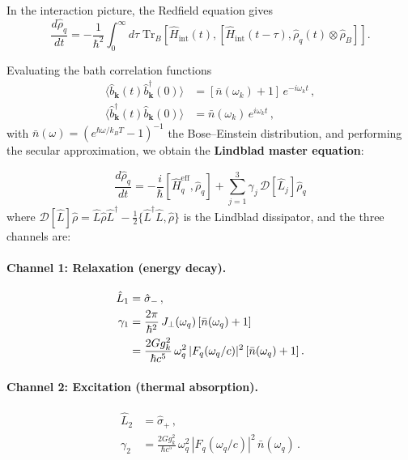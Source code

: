 \documentclass[aps,prl,twocolumn,superscriptaddress,nofootinbib,longbibliography]{revtex4-2}
\newcommand{\Tr}{\mathrm{Tr}}
\begin{document}
In the interaction picture, the Redfield equation gives
\begin{equation}
\frac{d\hat{\rho}_q}{dt} = -\frac{1}{\hbar^2}\int_0^\infty d\tau\;
\Tr_B\!\left[\hat{H}_{\text{int}}(t),
[\hat{H}_{\text{int}}(t-\tau), \hat{\rho}_q(t)\otimes\hat{\rho}_B]\right].
\end{equation}

Evaluating the bath correlation functions
\begin{align}
\langle\hat{b}_\mathbf{k}(t)\hat{b}_\mathbf{k}^\dagger(0)\rangle
&= [\bar{n}(\omega_k)+1]\,e^{-i\omega_k t}\,, \\
\langle\hat{b}_\mathbf{k}^\dagger(t)\hat{b}_\mathbf{k}(0)\rangle
&= \bar{n}(\omega_k)\,e^{i\omega_k t}\,,
\end{align}
with $\bar{n}(\omega) = (e^{\hbar\omega/k_BT} - 1)^{-1}$ the
Bose--Einstein distribution, and performing the secular approximation,
we obtain the \textbf{Lindblad master equation}:

\begin{equation}\label{eq:lindblad}
\boxed{
\frac{d\hat{\rho}_q}{dt} = -\frac{i}{\hbar}[\hat{H}_q^{\text{eff}},
\hat{\rho}_q] + \sum_{j=1}^{3} \gamma_j\,\mathcal{D}[\hat{L}_j]\hat{\rho}_q
}
\end{equation}
where $\mathcal{D}[\hat{L}]\hat{\rho} = \hat{L}\hat{\rho}\hat{L}^\dagger
- \frac{1}{2}\{\hat{L}^\dagger\hat{L}, \hat{\rho}\}$ is the Lindblad
dissipator, and the three channels are:

\paragraph{Channel 1: Relaxation (energy decay).}
\begin{align}
\hat{L}_1 &= \hat{\sigma}_-\,, \label{eq:L1}\\
\gamma_1 &= \frac{2\pi}{\hbar^2}\,J_\perp(\omega_q)\,
[\bar{n}(\omega_q) + 1] \notag\\
&= \frac{2G g_k^2}{\hbar c^5}\,\omega_q^2\,
|F_q(\omega_q/c)|^2\,[\bar{n}(\omega_q) + 1]\,.
\label{eq:gamma1}
\end{align}

\paragraph{Channel 2: Excitation (thermal absorption).}
\begin{align}
\hat{L}_2 &= \hat{\sigma}_+\,, \label{eq:L2}\\
\gamma_2 &= \frac{2G g_k^2}{\hbar c^5}\,\omega_q^2\,
|F_q(\omega_q/c)|^2\,\bar{n}(\omega_q)\,.
\label{eq:gamma2}
\end{align}
\end{document}
